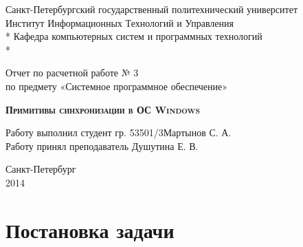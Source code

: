 \documentclass[a4paper,12pt]{article} %
\begin{document}
\begin{titlepage}
\newpage

\begin{center}
Санкт-Петербургский государственный политехнический университет \\
Институт Информационных Технологий и Управления \\*
Кафедра компьютерных систем и программных технологий \\*
\hrulefill
\end{center}

\vspace{18em}

\begin{center}
\Large Отчет по расчетной работе № 3 \\ по предмету «Системное программное обеспечение» \\
\end{center}

\vspace{1em}

\begin{center}
\textsc{\textbf{Примитивы синхронизации в ОС Windows}}
\end{center}

\vspace{16em}

\begin{flushleft}
Работу выполнил студент гр. 53501/3\hrulefill Мартынов С. А. \\
\vspace{1.5em}
Работу принял преподаватель \hrulefill Душутина Е. В. \\
\end{flushleft}

\vspace{\fill}

\begin{center}
Санкт-Петербург \\
2014
\end{center}

\end{titlepage}
\newpage

\section*{Постановка задачи}
\end{document}

